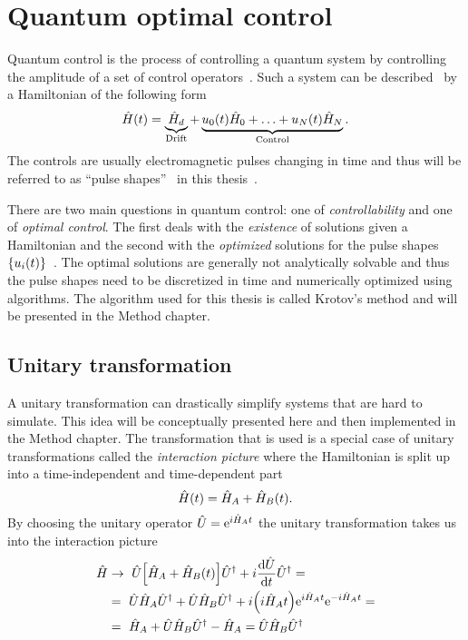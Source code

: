 \documentclass[main.tex]{subfiles}
\begin{document}
\section{Quantum optimal control}
Quantum control is the process of controlling a quantum system by controlling the amplitude of a set of control operators~\cite{fisher_optimal_2010}.
Such a system can be described~\cite{fisher_optimal_2010} by a Hamiltonian of the following form
\begin{equation}
    \hat{H}(t) = \underbrace{\hat{H}_d}_{\text{Drift}} + \underbrace{u_0(t)\hat{H}_0 + \dotsc + u_N(t)\hat{H}_N}_{\text{Control}}.
    \label{eq:optimal-control-hamiltonian}
\end{equation}
The controls are usually electromagnetic pulses changing in time and thus will be referred to as ``pulse shapes''~\cite{fisher_optimal_2010} in this thesis~.

There are two main questions in quantum control: one of \emph{controllability} and one of \emph{optimal control}.
The first deals with the \emph{existence} of solutions given a Hamiltonian and the second with the \emph{optimized} solutions for the pulse shapes \(\qty{u_i(t)}\)~\cite{dalessandro_introduction_2007}.
The optimal solutions are generally not analytically solvable and thus the pulse shapes need to be discretized in time and numerically optimized using algorithms.
The algorithm used for this thesis is called Krotov's method and will be presented in the Method chapter.

\subsection{Unitary transformation}
A unitary transformation can drastically simplify systems that are hard to simulate.
This idea will be conceptually presented here and then implemented in the Method chapter.
The transformation that is used is a special case of unitary transformations called the \emph{interaction picture} where the Hamiltonian is split up into a time-independent and time-dependent part
\begin{equation}
    \hat{H}(t) = \hat{H}_A + \hat{H}_B(t).
\end{equation}
By choosing the unitary operator \( \hat{U} = \mathrm{e}^{i \hat{H}_A t} \) the unitary transformation takes us into the interaction picture
\begin{align*}
    \hat{H} &\rightarrow~ \hat{U}\qty[ \hat{H}_A  + \hat{H}_B(t)]\hat{U}^\dagger + i\dv{\hat{U}}{t}\hat{U}^\dagger =\\
    &=~ \hat{U}\hat{H}_A\hat{U}^\dagger + \hat{U}\hat{H}_B\hat{U}^\dagger + i\qty(i\hat{H}_A t)\mathrm{e}^{i \hat{H}_A t}\mathrm{e}^{-i\hat{H}_A t}=\\
    &=~ \hat{H}_A + \hat{U}\hat{H}_B\hat{U}^\dagger - \hat{H}_A = \hat{U}\hat{H}_B\hat{U}^\dagger
\end{align*}
\end{document}
